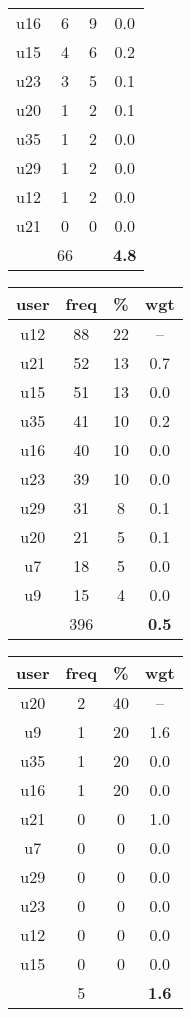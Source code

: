 \begin{appendices}
\begin{table}
\begin{tabular}{ |c|c|c|c| }
	u16 & 6 & 9 & 0.0 \\
	u15 & 4 & 6 & 0.2 \\
	u23 & 3 & 5 & 0.1 \\
	u20 & 1 & 2 & 0.1 \\
	u35 & 1 & 2 & 0.0 \\
	u29 & 1 & 2 & 0.0 \\
	u12 & 1 & 2 & 0.0 \\
	u21 & 0 & 0 & 0.0 \\
	 & 66 & & \textbf{4.8} \\
	\hline
\end{tabular}
\begin{tabular}{ |c|c|c|c| }
	\hline
	\textbf{user} & \textbf{freq} & \textbf{\%} & \textbf{wgt} \\
	\hline
	u12 & 88 & 22 & -- \\
	u21 & 52 & 13 & 0.7 \\
	u15 & 51 & 13 & 0.0 \\
	u35 & 41 & 10 & 0.2 \\
	u16 & 40 & 10 & 0.0 \\
	u23 & 39 & 10 & 0.0 \\
	u29 & 31 & 8 & 0.1 \\
	u20 & 21 & 5 & 0.1 \\
	u7 & 18 & 5 & 0.0 \\
	u9 & 15 & 4 & 0.0 \\
	 & 396 & & \textbf{0.5} \\
	\hline
\end{tabular}
\begin{tabular}{ |c|c|c|c| }
	\hline
	\textbf{user} & \textbf{freq} & \textbf{\%} & \textbf{wgt} \\
	\hline
	u20 & 2 & 40 & -- \\
	u9 & 1 & 20 & 1.6 \\
	u35 & 1 & 20 & 0.0 \\
	u16 & 1 & 20 & 0.0 \\
	u21 & 0 & 0 & 1.0 \\
	u7 & 0 & 0 & 0.0 \\
	u29 & 0 & 0 & 0.0 \\
	u23 & 0 & 0 & 0.0 \\
	u12 & 0 & 0 & 0.0 \\
	u15 & 0 & 0 & 0.0 \\
	 & 5 & & \textbf{1.6} \\
	\hline
\end{tabular}

\end{table}
\end{appendices}
